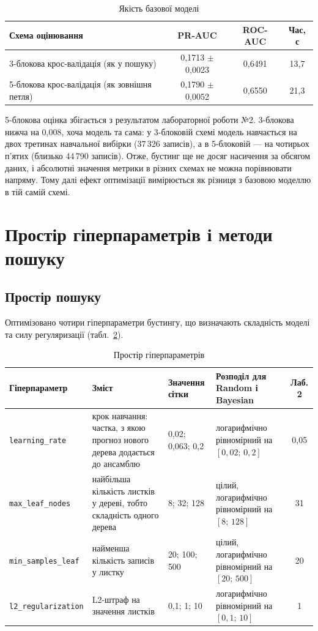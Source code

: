 \documentclass[14pt,a4paper]{extreport}
\begin{document}
\begin{table}[H]
\caption{Якість базової моделі}
\label{tab:baseline}
\begin{tabularx}{\linewidth}{|X|c|c|c|}
\hline
\textbf{Схема оцінювання} & \textbf{PR-AUC} & \textbf{ROC-AUC} & \textbf{Час, с} \\
\hline
3-блокова крос-валідація (як у пошуку) & 0,1713 $\pm$ 0,0023 & 0,6491 & 13,7 \\
\hline
5-блокова крос-валідація (як зовнішня петля) & 0,1790 $\pm$ 0,0052 & 0,6550 & 21,3 \\
\hline
\end{tabularx}
\end{table}

5-блокова оцінка збігається з результатом лабораторної роботи №2. 3-блокова нижча на 0,008, хоча модель та сама: у 3-блоковій схемі модель навчається на двох третинах навчальної вибірки (37\,326 записів), а в 5-блоковій --- на чотирьох п'ятих (близько 44\,790 записів). Отже, бустинг ще не досяг насичення за обсягом даних, і абсолютні значення метрики в різних схемах не можна порівнювати напряму. Тому далі ефект оптимізації вимірюється як різниця з базовою моделлю в тій самій схемі.

\section{Простір гіперпараметрів і методи пошуку}
\label{sec:space}

\subsection{Простір пошуку}

Оптимізовано чотири гіперпараметри бустингу, що визначають складність моделі та силу регуляризації (табл.~\ref{tab:space}).

\begin{table}[H]
\caption{Простір гіперпараметрів}
\label{tab:space}
\small
\renewcommand{\arraystretch}{1.15}
\begin{tabularx}{\linewidth}{|p{3.4cm}|X|p{2.7cm}|p{3.0cm}|c|}
\hline
\textbf{Гіперпараметр} & \textbf{Зміст} & \textbf{Значення сітки} & \textbf{Розподіл для Random і Bayesian} & \textbf{Лаб. 2} \\
\hline
\texttt{learning\_rate} & крок навчання: частка, з якою прогноз нового дерева додається до ансамблю & 0,02; 0,063; 0,2 & логарифмічно рівномірний на $[0{,}02;\,0{,}2]$ & 0,05 \\
\hline
\texttt{max\_leaf\_nodes} & найбільша кількість листків у дереві, тобто складність одного дерева & 8; 32; 128 & цілий, логарифмічно рівномірний на $[8;\,128]$ & 31 \\
\hline
\texttt{min\_samples\_leaf} & найменша кількість записів у листку & 20; 100; 500 & цілий, логарифмічно рівномірний на $[20;\,500]$ & 20 \\
\hline
\texttt{l2\_regularization} & L2-штраф на значення листків & 0,1; 1; 10 & логарифмічно рівномірний на $[0{,}1;\,10]$ & 1 \\
\hline
\end{tabularx}
\end{table}
\end{document}
